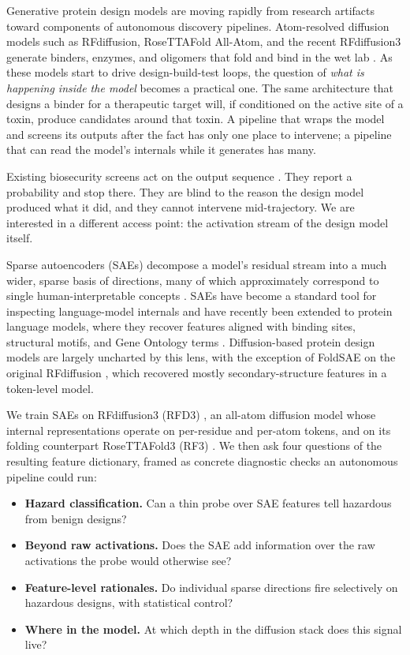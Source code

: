 \documentclass{article}
\theoremstyle{plain}
\theoremstyle{definition}
\theoremstyle{remark}
\begin{document}
Generative protein design models are moving rapidly from research artifacts toward components of autonomous discovery pipelines. Atom-resolved diffusion models such as RFdiffusion, RoseTTAFold All-Atom, and the recent RFdiffusion3 generate binders, enzymes, and oligomers that fold and bind in the wet lab \cite{watson2023rfdiffusion,krishna2024rfaa,butcher2025rfdiffusion3}. As these models start to drive design-build-test loops, the question of \emph{what is happening inside the model} becomes a practical one. The same architecture that designs a binder for a therapeutic target will, if conditioned on the active site of a toxin, produce candidates around that toxin. A pipeline that wraps the model and screens its outputs after the fact has only one place to intervene; a pipeline that can read the model's internals while it generates has many.

Existing biosecurity screens act on the output sequence \cite{garg2008virulentpred,singh2024vfpred,sun2024dtvf,chen2025virulenthunter}. They report a probability and stop there. They are blind to the reason the design model produced what it did, and they cannot intervene mid-trajectory. We are interested in a different access point: the activation stream of the design model itself.

Sparse autoencoders (SAEs) decompose a model's residual stream into a much wider, sparse basis of directions, many of which approximately correspond to single human-interpretable concepts \cite{bricken2023monosemanticity,cunningham2024sparse,templeton2024scaling}. SAEs have become a standard tool for inspecting language-model internals and have recently been extended to protein language models, where they recover features aligned with binding sites, structural motifs, and Gene Ontology terms \cite{simon2025interplm,adams2025mechanistic,parsan2025interpretable}. Diffusion-based protein design models are largely uncharted by this lens, with the exception of FoldSAE on the original RFdiffusion \cite{zarzecki2025foldsae}, which recovered mostly secondary-structure features in a token-level model.

We train SAEs on RFdiffusion3 (RFD3) \cite{butcher2025rfdiffusion3}, an all-atom diffusion model whose internal representations operate on per-residue and per-atom tokens, and on its folding counterpart RoseTTAFold3 (RF3) \cite{krishna2024rfaa}. We then ask four questions of the resulting feature dictionary, framed as concrete diagnostic checks an autonomous pipeline could run:

\begin{itemize}
    \item \textbf{Hazard classification.} Can a thin probe over SAE features tell hazardous from benign designs?
    \item \textbf{Beyond raw activations.} Does the SAE add information over the raw activations the probe would otherwise see?
    \item \textbf{Feature-level rationales.} Do individual sparse directions fire selectively on hazardous designs, with statistical control?
    \item \textbf{Where in the model.} At which depth in the diffusion stack does this signal live?
\end{itemize}
\end{document}
